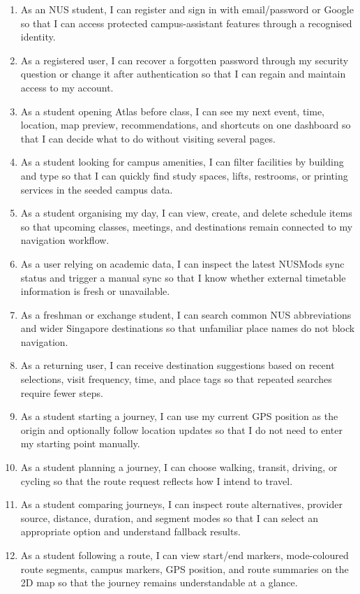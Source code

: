 \documentclass[11pt]{article}
\begin{document}
\begin{enumerate}[leftmargin=*]
    \item As an NUS student, I can register and sign in with email/password or Google so that I can access protected campus-assistant features through a recognised identity.
    \item As a registered user, I can recover a forgotten password through my security question or change it after authentication so that I can regain and maintain access to my account.
    \item As a student opening Atlas before class, I can see my next event, time, location, map preview, recommendations, and shortcuts on one dashboard so that I can decide what to do without visiting several pages.
    \item As a student looking for campus amenities, I can filter facilities by building and type so that I can quickly find study spaces, lifts, restrooms, or printing services in the seeded campus data.
    \item As a student organising my day, I can view, create, and delete schedule items so that upcoming classes, meetings, and destinations remain connected to my navigation workflow.
    \item As a user relying on academic data, I can inspect the latest NUSMods sync status and trigger a manual sync so that I know whether external timetable information is fresh or unavailable.
    \item As a freshman or exchange student, I can search common NUS abbreviations and wider Singapore destinations so that unfamiliar place names do not block navigation.
    \item As a returning user, I can receive destination suggestions based on recent selections, visit frequency, time, and place tags so that repeated searches require fewer steps.
    \item As a student starting a journey, I can use my current GPS position as the origin and optionally follow location updates so that I do not need to enter my starting point manually.
    \item As a student planning a journey, I can choose walking, transit, driving, or cycling so that the route request reflects how I intend to travel.
    \item As a student comparing journeys, I can inspect route alternatives, provider source, distance, duration, and segment modes so that I can select an appropriate option and understand fallback results.
    \item As a student following a route, I can view start/end markers, mode-coloured route segments, campus markers, GPS position, and route summaries on the 2D map so that the journey remains understandable at a glance.

\end{enumerate}
\end{document}
